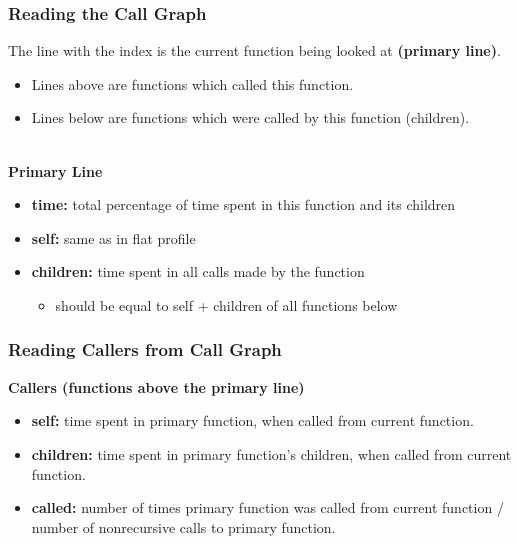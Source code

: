 \begin{frame}[fragile]
  \frametitle{Reading the Call Graph}

\large
\begin{changemargin}{1.5cm}
  
    The line with the index is the current function being looked at {\bf (primary line)}.\\
\begin{itemize}
    \item Lines above are functions which called this function.
    \item Lines below are functions which were called by this function
      (children).
  \end{itemize}
~\\
  {\bf Primary Line}

  \begin{itemize}  
    \item {\bf time:} total percentage of time spent in this function and its
      children
    \item {\bf self:} same as in flat profile
    \item {\bf children:} time spent in all calls made by the function
      \begin{itemize}
        \item should be equal to self + children of all functions below
      \end{itemize}
  \end{itemize}
  \end{changemargin}
\end{frame}

\begin{frame}[fragile]
  \frametitle{Reading Callers from Call Graph}

  
\large
\begin{changemargin}{1.5cm}
  {\bf Callers (functions above the primary line)}
  \begin{itemize}  
    \item {\bf self:} time spent in primary function, when called from current
      function.
    \item {\bf children:} time spent in primary function's children, when
      called from current function.
    \item {\bf called:} number of times primary function was called from current
      function / number of nonrecursive calls to primary function.
  \end{itemize}
  \end{changemargin}
\end{frame}

